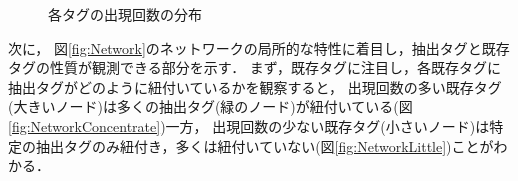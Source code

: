 \begin{figure}[htb]
\begin{center}
\hspace*{-20pt}
\end{center}
\caption{各タグの出現回数の分布}
\label{fig:AppearHist}
\end{figure}


次に，
図\ref{fig:Network}のネットワークの局所的な特性に着目し，抽出タグと既存タグの性質が観測できる部分を示す．
まず，既存タグに注目し，各既存タグに抽出タグがどのように紐付いているかを観察すると，
出現回数の多い既存タグ(大きいノード)は多くの抽出タグ(緑のノード)が紐付いている(図\ref{fig:NetworkConcentrate})一方，
出現回数の少ない既存タグ(小さいノード)は特定の抽出タグのみ紐付き，多くは紐付いていない(図\ref{fig:NetworkLittle})ことがわかる．

